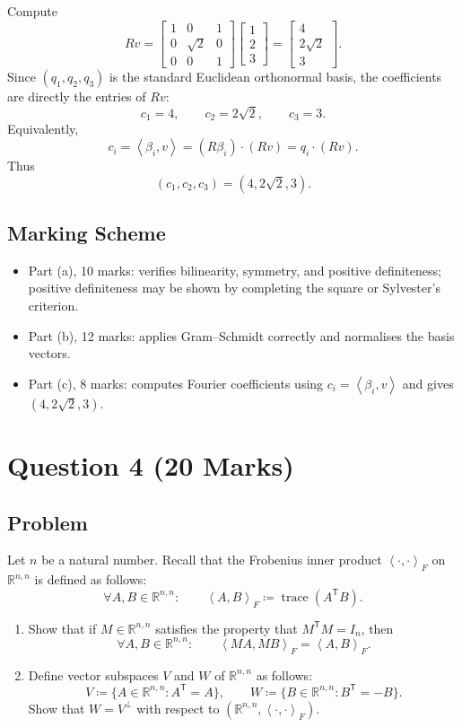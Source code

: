 \documentclass[12pt]{article}
\newcommand{\R}{\mathbb{R}}
\newcommand{\df}{\coloneqq}
\newcommand{\tr}{\operatorname{trace}}
\newcommand{\ip}[2]{\left\langle #1,#2\right\rangle}
\newcommand{\ipF}[2]{\left\langle #1,#2\right\rangle_F}
\newcommand{\T}{\mathsf{T}}
\begin{document}
\begin{enumerate}[label=(\alph*)]
  Compute
  \[
    Rv=
    \begin{bmatrix}
      1&0&1\\
      0&\sqrt2&0\\
      0&0&1
    \end{bmatrix}
    \begin{bmatrix}1\\2\\3\end{bmatrix}
    =
    \begin{bmatrix}4\\2\sqrt2\\3\end{bmatrix}.
  \]
  Since $(q_1,q_2,q_3)$ is the standard Euclidean orthonormal basis, the
  coefficients are directly the entries of $Rv$:
  \[
    c_1=4,
    \qquad
    c_2=2\sqrt2,
    \qquad
    c_3=3.
  \]
  Equivalently,
  \[
    c_i=\ip{\beta_i}{v}
    =
    (R\beta_i)\cdot(Rv)
    =
    q_i\cdot(Rv).
  \]
  Thus
  \[
    \boxed{(c_1,c_2,c_3)=(4,2\sqrt2,3).}
  \]
\end{enumerate}

\newpage
\subsection{Marking Scheme}
\begin{itemize}[leftmargin=*]
  \item Part (a), 10 marks: verifies bilinearity, symmetry, and positive definiteness; positive definiteness may be shown by completing the square or Sylvester's criterion.
  \item Part (b), 12 marks: applies Gram--Schmidt correctly and normalises the basis vectors.
  \item Part (c), 8 marks: computes Fourier coefficients using $c_i=\ip{\beta_i}{v}$ and gives $(4,2\sqrt2,3)$.
\end{itemize}

\newpage
\section{Question 4 \hfill (20 Marks)}

\subsection{Problem}
Let $n$ be a natural number. Recall that the Frobenius inner product $\ipF{\cdot}{\cdot}$ on $\R^{n,n}$ is defined as follows:
\[
  \forall A,B\in\R^{n,n}:\qquad
  \ipF{A}{B}\df \tr(A^\T B).
\]
\begin{enumerate}[label=(\alph*)]
  \item Show that if $M\in\R^{n,n}$ satisfies the property that $M^\T M=I_n$, then
  \[
    \forall A,B\in\R^{n,n}:\qquad
    \ipF{MA}{MB}=\ipF{A}{B}.
  \]
  \item Define vector subspaces $V$ and $W$ of $\R^{n,n}$ as follows:
  \[
    V\df\{A\in\R^{n,n}:A^\T=A\},
    \qquad
    W\df\{B\in\R^{n,n}:B^\T=-B\}.
  \]
  Show that $W=V^\perp$ with respect to $(\R^{n,n},\ipF{\cdot}{\cdot})$.
\end{enumerate}
\end{document}
